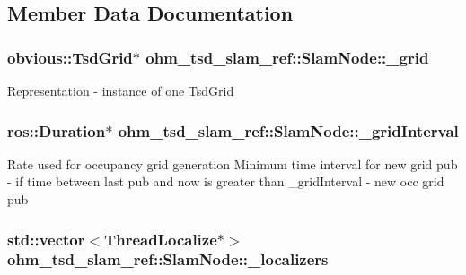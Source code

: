 \subsection{Member Data Documentation}
\hypertarget{classohm__tsd__slam__ref_1_1SlamNode_a2b737790f425b4397bb7fb39373d4c3e}{
\subsubsection[{\-\_\-grid}]{\setlength{\rightskip}{0pt plus 5cm}obvious\-::\-Tsd\-Grid$\ast$ ohm\-\_\-tsd\-\_\-slam\-\_\-ref\-::\-Slam\-Node\-::\-\_\-grid\hspace{0.3cm}{\ttfamily [private]}}}\label{classohm__tsd__slam__ref_1_1SlamNode_a2b737790f425b4397bb7fb39373d4c3e}
Representation -\/ instance of one Tsd\-Grid \hypertarget{classohm__tsd__slam__ref_1_1SlamNode_a00ff10e215f1e307fca09351b25cc7c5}{
\subsubsection[{\-\_\-grid\-Interval}]{\setlength{\rightskip}{0pt plus 5cm}ros\-::\-Duration$\ast$ ohm\-\_\-tsd\-\_\-slam\-\_\-ref\-::\-Slam\-Node\-::\-\_\-grid\-Interval\hspace{0.3cm}{\ttfamily [private]}}}\label{classohm__tsd__slam__ref_1_1SlamNode_a00ff10e215f1e307fca09351b25cc7c5}
Rate used for occupancy grid generation Minimum time interval for new grid pub -\/ if time between last pub and now is greater than \-\_\-grid\-Interval -\/ new occ grid pub \hypertarget{classohm__tsd__slam__ref_1_1SlamNode_abe1e2022599a8ce220de76b142486ea8}{
\subsubsection[{\-\_\-localizers}]{\setlength{\rightskip}{0pt plus 5cm}std\-::vector$<${\bf Thread\-Localize}$\ast$$>$ ohm\-\_\-tsd\-\_\-slam\-\_\-ref\-::\-Slam\-Node\-::\-\_\-localizers\hspace{0.3cm}{\ttfamily [private]}}}\label{classohm__tsd__slam__ref_1_1SlamNode_abe1e2022599a8ce220de76b142486ea8}

